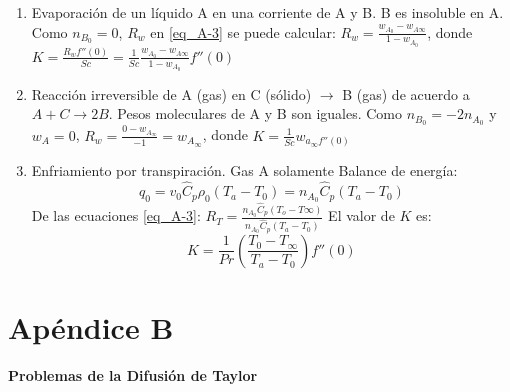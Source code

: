 \begin{enumerate}
    \item Evaporación de un líquido A en una corriente de A y B. B es insoluble en A. \newline
    Como $n_{B_0}=0$, $R_w$ en \eqref{eq_A-3} se puede calcular: $R_w=\frac{w_{A_0}-w_{A\infty}}{1-w_{A_0}}$, donde $K=\frac{R_w f''(0)}{Sc}=\frac{1}{Sc}\frac{w_{A_0}-w_{A\infty}}{1-w_{A_0}}f''(0)$
    \item Reacción irreversible de A (gas) en C (sólido) $\to$ B (gas) de acuerdo a $A+C\to 2B$. Pesos moleculares de A y B son iguales. Como $n_{B_0}=-2n_{A_0}$ y $w_A=0$, $R_w=\frac{0-w_{A_\infty}}{-1}=w_{A_\infty}$, donde $K=\frac{1}{Sc}w_{a_\infty f''(0)}$
    \item Enfriamiento por transpiración. Gas A solamente
    \newline 
    Balance de energía:
    \begin{equation*}
        q_0=v_0\hat{C}_p\rho_0(T_a-T_0 )=n_{A_0}\hat{C}_p(T_a-T_0)
    \end{equation*}
    De las ecuaciones \eqref{eq_A-3}: $R_T=\frac{n_{A_0}\hat{C}_p(T_o-T\infty)}{n_{A_0}\hat{C}_p(T_a-T_0)}$
    \newline
    El valor de \( K \) es: \[ K = \frac{1}{Pr} \left( \frac{T_0 - T_\infty}{T_a - T_0} \right) f''(0) \]
\end{enumerate}
\section*{Apéndice B}
 \textbf{Problemas de la Difusión de Taylor}
 \vspace{0.6 cm}
    
